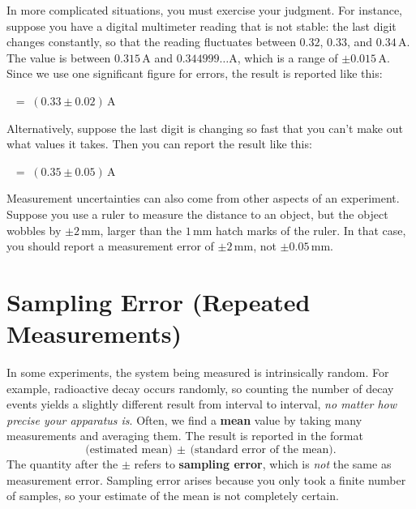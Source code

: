\documentclass[11pt,a4paper]{article}
\begin{document}
In more complicated situations, you must exercise your judgment.  For
instance, suppose you have a digital multimeter reading that is not
stable: the last digit changes constantly, so that the reading
fluctuates between $0.32$, $0.33$, and $0.34\,\mathrm{A}$.  The value
is between $0.315\,\mathrm{A}$ and $0.344999\dots\mathrm{A}$, which is
a range of $\pm0.015\,\mathrm{A}$.  Since we use one significant
figure for errors, the result is reported like this:
\begin{center}
$\;\;=\; \left(0.33 \pm 0.02\right) \, \mathrm{A}$
\end{center}
Alternatively, suppose the last digit is changing so fast that you
can't make out what values it takes.  Then you can report the result
like this:
\begin{center}
$\;\;=\; \left(0.35 \pm 0.05\right) \, \mathrm{A}$
\end{center}

Measurement uncertainties can also come from other aspects of an
experiment.  Suppose you use a ruler to measure the distance to an
object, but the object wobbles by $\pm 2\,\textrm{mm}$, larger than
the $1\,\textrm{mm}$ hatch marks of the ruler.  In that case, you should
report a measurement error of $\pm 2\,\textrm{mm}$, not $\pm
0.05\,\textrm{mm}$.

\section{Sampling Error (Repeated Measurements)}

In some experiments, the system being measured is intrinsically
random.  For example, radioactive decay occurs randomly, so counting
the number of decay events yields a slightly different result from
interval to interval, \textit{no matter how precise your apparatus
  is}.  Often, we find a \textbf{mean} value by taking many
measurements and averaging them.  The result is reported in the format
\begin{equation*}
  \textrm{(estimated mean)} \,\pm\, \textrm{(standard error of the mean)}.
\end{equation*}
The quantity after the $\pm$ refers to \textbf{sampling error}, which
is \textit{not} the same as measurement error.  Sampling error arises
because you only took a finite number of samples, so your estimate of
the mean is not completely certain.
\end{document}
